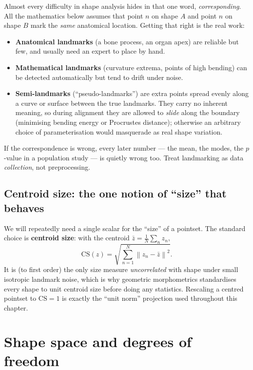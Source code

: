 \documentclass[11pt]{article}
\newcommand{\norm}[1]{\left\lVert #1 \right\rVert}
\begin{document}
Almost every difficulty in shape analysis hides in that one word,
\emph{corresponding}. All the mathematics below assumes that point $n$ on shape
$A$ and point $n$ on shape $B$ mark the \emph{same} anatomical location. Getting
that right is the real work:
\begin{itemize}[nosep,leftmargin=*]
  \item \textbf{Anatomical landmarks} (a bone process, an organ apex) are
  reliable but few, and usually need an expert to place by hand.
  \item \textbf{Mathematical landmarks} (curvature extrema, points of high
  bending) can be detected automatically but tend to drift under noise.
  \item \textbf{Semi-landmarks} (``pseudo-landmarks'') are extra points spread
  evenly along a curve or surface between the true landmarks. They carry no
  inherent meaning, so during alignment they are allowed to \emph{slide} along
  the boundary (minimising bending energy or Procrustes distance); otherwise an
  arbitrary choice of parameterisation would masquerade as real shape variation.
\end{itemize}
If the correspondence is wrong, every later number --- the mean, the modes, the
$p$-value in a population study --- is quietly wrong too. Treat landmarking as
data \emph{collection}, not preprocessing.

\subsection{Centroid size: the one notion of ``size'' that behaves}

We will repeatedly need a single scalar for the ``size'' of a pointset. The
standard choice is \textbf{centroid size}: with the centroid
$\bar z = \tfrac1N\sum_n z_n$,
\[
\mathrm{CS}(z) = \sqrt{\textstyle\sum_{n=1}^{N}\norm{z_n - \bar z}^2}.
\]
It is (to first order) the only size measure \emph{uncorrelated} with shape
under small isotropic landmark noise, which is why geometric morphometrics
standardises every shape to unit centroid size before doing any statistics.
Rescaling a centred pointset to $\mathrm{CS}=1$ is exactly the ``unit norm''
projection used throughout this chapter.

\section{Shape space and degrees of freedom}
\end{document}
